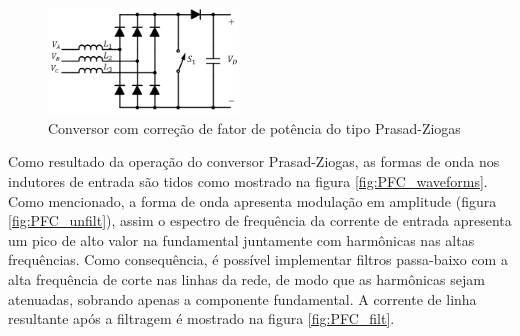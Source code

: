 \begin{figure}[!htbp] %
	\centering
	\includegraphics[width=0.45\textwidth]{Cap2/Figuras/PFC_converter.png}
	\caption{Conversor com correção de fator de potência do tipo Prasad-Ziogas \cite{Takeuchi2008}}
	\label{fig:PFC_converter}
\end{figure}


Como resultado da operação do conversor Prasad-Ziogas, as formas de onda nos indutores de entrada são tidos como mostrado na figura \ref{fig:PFC_waveforms}. Como mencionado, a forma de onda apresenta modulação em amplitude (figura \ref{fig:PFC_unfilt}), assim o espectro de frequência da corrente de entrada apresenta um pico de alto valor na fundamental juntamente com harmônicas nas altas frequências. Como consequência, é possível implementar filtros passa-baixo com a alta frequência de corte nas linhas da rede, de modo que as harmônicas sejam atenuadas, sobrando apenas a componente fundamental. A corrente de linha resultante após a filtragem é mostrado na figura \ref{fig:PFC_filt}.

